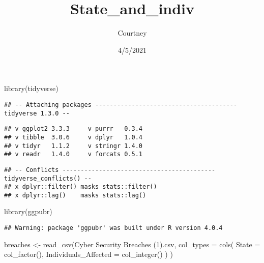 \documentclass[
]{article}
\title{State\_and\_indiv}
\author{Courtney}
\date{4/5/2021}
\newenvironment{Shaded}{\begin{snugshade}}{\end{snugshade}}
\newcommand{\AttributeTok}[1]{\textcolor[rgb]{0.77,0.63,0.00}{#1}}
\newcommand{\FunctionTok}[1]{\textcolor[rgb]{0.00,0.00,0.00}{#1}}
\newcommand{\NormalTok}[1]{#1}
\newcommand{\OtherTok}[1]{\textcolor[rgb]{0.56,0.35,0.01}{#1}}
\newcommand{\StringTok}[1]{\textcolor[rgb]{0.31,0.60,0.02}{#1}}
\begin{document}
\maketitle

\begin{Shaded}
\begin{Highlighting}[]
\FunctionTok{library}\NormalTok{(tidyverse)}
\end{Highlighting}
\end{Shaded}

\begin{verbatim}
## -- Attaching packages --------------------------------------- tidyverse 1.3.0 --
\end{verbatim}

\begin{verbatim}
## v ggplot2 3.3.3     v purrr   0.3.4
## v tibble  3.0.6     v dplyr   1.0.4
## v tidyr   1.1.2     v stringr 1.4.0
## v readr   1.4.0     v forcats 0.5.1
\end{verbatim}

\begin{verbatim}
## -- Conflicts ------------------------------------------ tidyverse_conflicts() --
## x dplyr::filter() masks stats::filter()
## x dplyr::lag()    masks stats::lag()
\end{verbatim}

\begin{Shaded}
\begin{Highlighting}[]
\FunctionTok{library}\NormalTok{(ggpubr)}
\end{Highlighting}
\end{Shaded}

\begin{verbatim}
## Warning: package 'ggpubr' was built under R version 4.0.4
\end{verbatim}

\begin{Shaded}
\begin{Highlighting}[]
\NormalTok{breaches }\OtherTok{\textless{}{-}} \FunctionTok{read\_csv}\NormalTok{(}\StringTok{\textquotesingle{}Cyber Security Breaches (1).csv\textquotesingle{}}\NormalTok{,}
                     \AttributeTok{col\_types =} \FunctionTok{cols}\NormalTok{(}
                      \AttributeTok{State =} \FunctionTok{col\_factor}\NormalTok{(),}
                      \AttributeTok{Individuals\_Affected =} \FunctionTok{col\_integer}\NormalTok{()}
\NormalTok{                     )}
\NormalTok{                  )}
\end{Highlighting}
\end{Shaded}
\end{document}
